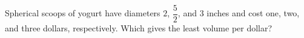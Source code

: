 Spherical scoops of yogurt have diameters $2$, $\dfrac{5}{2}$, and $3$ inches and cost one, two, and three dollars, respectively. Which gives the least volume per dollar?
